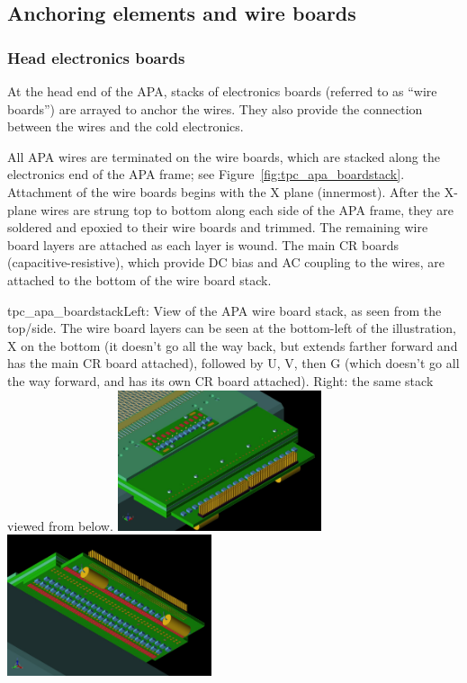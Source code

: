 \subsection{Anchoring elements and wire boards}
\label{subsubsec:apa_wire_anchor}


\subsubsection{Head electronics boards}

At the head end of the APA, stacks of electronics boards (referred to as ``wire boards'') are arrayed to anchor the wires.  They also provide the connection between the wires and the %
cold electronics.

All APA wires are terminated on the wire boards, which are stacked along the electronics end of the APA frame; see Figure~\ref{fig:tpc_apa_boardstack}. 
Attachment of the wire boards begins with the X plane (innermost). After the X-plane wires are strung top to bottom along each side of the APA frame, they are soldered and epoxied to their wire boards and trimmed. The remaining wire board layers are attached as each layer is wound.  The main CR boards (capacitive-resistive), which provide DC bias and AC coupling to the wires, are attached to the bottom of the wire board stack. %

\begin{cdrfigure}{tpc_apa_boardstack}{Left: View of the APA wire board stack, as seen from the top/side. The wire board layers can be seen at the bottom-left of the illustration, X on the bottom (it doesn't go all the way back, but extends farther forward and has the main CR board attached), followed by U, V, then G (which doesn't go all the way forward, and has its own CR board attached).  Right: the same stack viewed from below.  }
\includegraphics[width=0.45\textwidth]{figures/tpc_apa_boardstack_top.png}
\includegraphics[width=0.45\textwidth]{figures/tpc_apa_boardstack_bottom.png}
\end{cdrfigure}

